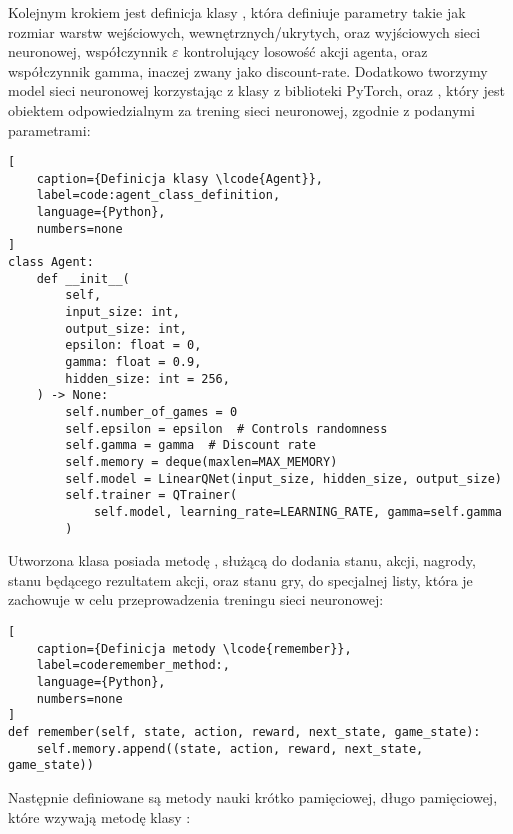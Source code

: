 Kolejnym krokiem jest definicja klasy , która definiuje parametry takie jak rozmiar warstw wejściowych, wewnętrznych/ukrytych, oraz wyjściowych sieci neuronowej, współczynnik $\varepsilon$ kontrolujący losowość akcji agenta, oraz współczynnik gamma, inaczej zwany jako discount-rate. Dodatkowo tworzymy model sieci neuronowej  korzystając z klasy  z biblioteki PyTorch, oraz , który jest obiektem odpowiedzialnym za trening sieci neuronowej, zgodnie z podanymi parametrami:

\begin{onepage}
    \begin{lstlisting}[
    caption={Definicja klasy \lcode{Agent}},
    label=code:agent_class_definition,
    language={Python},
    numbers=none
]
class Agent:
    def __init__(
        self,
        input_size: int,
        output_size: int,
        epsilon: float = 0,
        gamma: float = 0.9,
        hidden_size: int = 256,
    ) -> None:
        self.number_of_games = 0
        self.epsilon = epsilon  # Controls randomness
        self.gamma = gamma  # Discount rate
        self.memory = deque(maxlen=MAX_MEMORY)
        self.model = LinearQNet(input_size, hidden_size, output_size)
        self.trainer = QTrainer(
            self.model, learning_rate=LEARNING_RATE, gamma=self.gamma
        )
    \end{lstlisting}
\end{onepage}

Utworzona klasa posiada metodę , służącą do dodania stanu, akcji, nagrody, stanu będącego rezultatem akcji, oraz stanu gry, do specjalnej listy, która je zachowuje w celu przeprowadzenia treningu sieci neuronowej:


\begin{onepage}
    \begin{lstlisting}[
    caption={Definicja metody \lcode{remember}},
    label=coderemember_method:,
    language={Python},
    numbers=none
]
def remember(self, state, action, reward, next_state, game_state):
    self.memory.append((state, action, reward, next_state, game_state))
    \end{lstlisting}
\end{onepage}



Następnie definiowane są metody nauki krótko pamięciowej, długo pamięciowej, które wzywają metodę  klasy :


